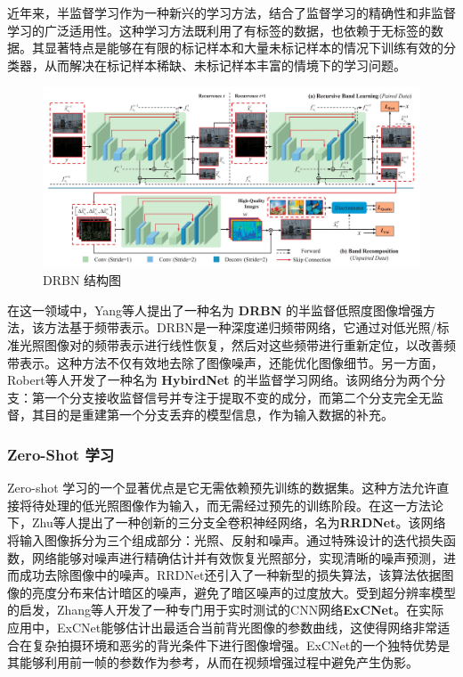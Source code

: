 \documentclass[a4paper]{ctexart}
\begin{document}
	近年来，半监督学习作为一种新兴的学习方法，结合了监督学习的精确性和非监督学习的广泛适用性。这种学习方法既利用了有标签的数据，也依赖于无标签的数据。其显著特点是能够在有限的标记样本和大量未标记样本的情况下训练有效的分类器，从而解决在标记样本稀缺、未标记样本丰富的情境下的学习问题。
	
	\begin{figure}[htb]
		\centering 
		\includegraphics[width=0.7\columnwidth]{picture/LLIE/DRBN/DRBN}
		\caption{
			\label{fig: DRBN} 
			DRBN 结构图
		}
	\end{figure}
	
	在这一领域中，Yang等人\cite{qiao2021deep}提出了一种名为 \textbf{DRBN} 的半监督低照度图像增强方法，该方法基于频带表示。DRBN是一种深度递归频带网络，它通过对低光照/标准光照图像对的频带表示进行线性恢复，然后对这些频带进行重新定位，以改善频带表示。这种方法不仅有效地去除了图像噪声，还能优化图像细节。另一方面，Robert等人开发了一种名为 \textbf{HybirdNet} 的半监督学习网络\cite{robert2018hybridnet}。该网络分为两个分支：第一个分支接收监督信号并专注于提取不变的成分，而第二个分支完全无监督，其目的是重建第一个分支丢弃的模型信息，作为输入数据的补充。
	
	\subsubsection{Zero-Shot 学习}
	
	Zero-shot 学习的一个显著优点是它无需依赖预先训练的数据集。这种方法允许直接将待处理的低光照图像作为输入，而无需经过预先的训练阶段。在这一方法论下，Zhu等人\cite{zhu2020zero}提出了一种创新的三分支全卷积神经网络，名为\textbf{RRDNet}。该网络将输入图像拆分为三个组成部分：光照、反射和噪声。通过特殊设计的迭代损失函数，网络能够对噪声进行精确估计并有效恢复光照部分，实现清晰的噪声预测，进而成功去除图像中的噪声。RRDNet还引入了一种新型的损失算法，该算法依据图像的亮度分布来估计暗区的噪声，避免了暗区噪声的过度放大。受到超分辨率模型的启发，Zhang等人\cite{zhang2019zero}开发了一种专门用于实时测试的CNN网络\textbf{ExCNet}。在实际应用中，ExCNet能够估计出最适合当前背光图像的参数曲线，这使得网络非常适合在复杂拍摄环境和恶劣的背光条件下进行图像增强。ExCNet的一个独特优势是其能够利用前一帧的参数作为参考，从而在视频增强过程中避免产生伪影。
	
\end{document}
